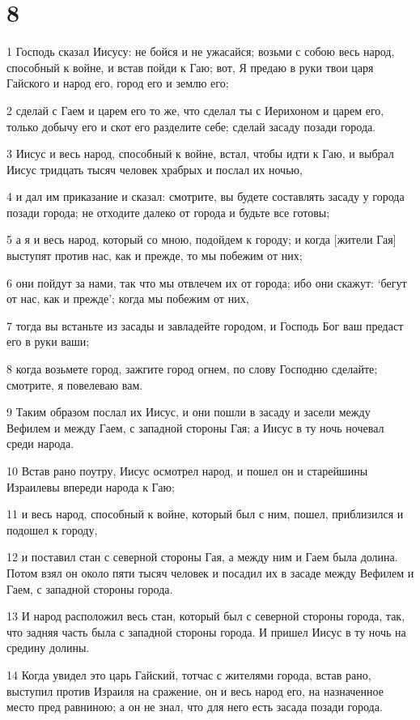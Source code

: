 \chapter{8}

\par 1 Господь сказал Иисусу: не бойся и не ужасайся; возьми с собою весь народ, способный к войне, и встав пойди к Гаю; вот, Я предаю в руки твои царя Гайского и народ его, город его и землю его;
\par 2 сделай с Гаем и царем его то же, что сделал ты с Иерихоном и царем его, только добычу его и скот его разделите себе; сделай засаду позади города.
\par 3 Иисус и весь народ, способный к войне, встал, чтобы идти к Гаю, и выбрал Иисус тридцать тысяч человек храбрых и послал их ночью,
\par 4 и дал им приказание и сказал: смотрите, вы будете составлять засаду у города позади города; не отходите далеко от города и будьте все готовы;
\par 5 а я и весь народ, который со мною, подойдем к городу; и когда [жители Гая] выступят против нас, как и прежде, то мы побежим от них;
\par 6 они пойдут за нами, так что мы отвлечем их от города; ибо они скажут: `бегут от нас, как и прежде'; когда мы побежим от них,
\par 7 тогда вы встаньте из засады и завладейте городом, и Господь Бог ваш предаст его в руки ваши;
\par 8 когда возьмете город, зажгите город огнем, по слову Господню сделайте; смотрите, я повелеваю вам.
\par 9 Таким образом послал их Иисус, и они пошли в засаду и засели между Вефилем и между Гаем, с западной стороны Гая; а Иисус в ту ночь ночевал среди народа.
\par 10 Встав рано поутру, Иисус осмотрел народ, и пошел он и старейшины Израилевы впереди народа к Гаю;
\par 11 и весь народ, способный к войне, который был с ним, пошел, приблизился и подошел к городу,
\par 12 и поставил стан с северной стороны Гая, а между ним и Гаем была долина. Потом взял он около пяти тысяч человек и посадил их в засаде между Вефилем и Гаем, с западной стороны города.
\par 13 И народ расположил весь стан, который был с северной стороны города, так, что задняя часть была с западной стороны города. И пришел Иисус в ту ночь на средину долины.
\par 14 Когда увидел это царь Гайский, тотчас с жителями города, встав рано, выступил против Израиля на сражение, он и весь народ его, на назначенное место пред равниною; а он не знал, что для него есть засада позади города.
